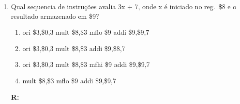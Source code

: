 \documentclass[a4paper,11pt,fleqn]{article}
\begin{document}
\begin{enumerate}
    \item{Qual sequencia de instruções avalia 3x + 7, onde x é iniciado no reg.\ \$8 e o resultado
            armazenado em \$9?}
        \begin{enumerate}
            \item{ori \$3,\$0,3 \newline mult \$8,\$3 \newline mflo \$9 \newline addi \$9,\$9,7}
            \item{ori \$3,\$0,3 \newline mult \$8,\$3 \newline addi \$9,\$8,7}
            \item{ori \$3,\$0,3 \newline mult \$8,\$3 \newline mfhi \$9 \newline addi \$9,\$9,7}
            \item{mult \$8,\$3 \newline mflo \$9 \newline addi \$9,\$9,7}
        \end{enumerate}
        \textbf{R:}
\end{enumerate}
\newpage
{}
\end{document}
